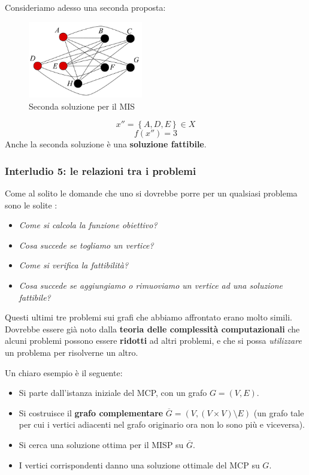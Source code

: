 \documentclass{article}
\begin{document}
Consideriamo adesso una seconda proposta:
\begin{figure}[H]
    \centering
    \includegraphics[width=5cm]{images/MIS_sol2.png}
    \caption{Seconda soluzione per il MIS}
    \label{fig:MIS_2}
\end{figure}

$$x''=\left\{A,D,E\right\}\in X$$
$$f(x'')=3$$
Anche la seconda soluzione è una \textbf{soluzione fattibile}.

\subsubsection{Interludio 5: le relazioni tra i problemi}
Come al solito le domande che uno si dovrebbe porre per un qualsiasi problema sono le solite :
\begin{itemize}
    \item \textit{Come si calcola la funzione obiettivo?}
    \item \textit{Cosa succede se togliamo un vertice?}
    \item \textit{Come si verifica la fattibilità?}
    \item \textit{Cosa succede se aggiungiamo o rimuoviamo un vertice ad una soluzione fattibile?}
\end{itemize}

Questi ultimi tre problemi sui grafi che abbiamo affrontato erano molto simili. Dovrebbe essere già noto
dalla \textbf{teoria delle complessità computazionali} che alcuni problemi possono essere \textbf{ridotti} ad altri
problemi, e che si possa \textit{utilizzare} un problema per risolverne un altro.

Un chiaro esempio è il seguente:
\begin{itemize}
    \item Si parte dall'istanza iniziale del MCP, con un grafo $G=(V,E)$.
    \item Si costruisce il \textbf{grafo complementare} $\overline{G}=(V,(V\times V)\setminus E)$ (un grafo tale
          per cui i vertici adiacenti nel grafo originario ora non lo sono più e viceversa).
    \item Si cerca una soluzione ottima per il MISP su $\overline{G}$.
    \item I vertici corrispondenti danno una soluzione ottimale del MCP su $G$.
\end{itemize}
\end{document}
